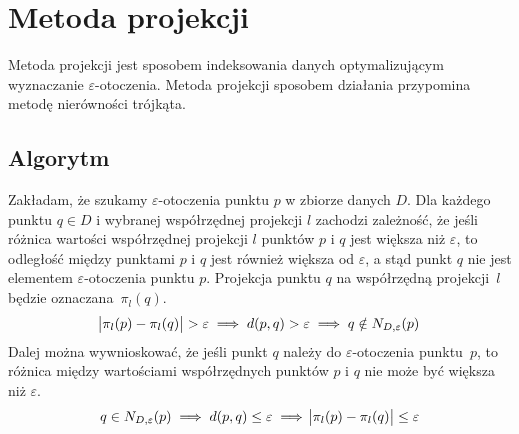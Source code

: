 \section{Metoda projekcji}
Metoda projekcji jest sposobem indeksowania danych optymalizującym wyznaczanie $ \varepsilon $-otoczenia. Metoda projekcji sposobem działania przypomina metodę nierówności trójkąta.
\subsection{Algorytm}
Zakładam, że szukamy $ \varepsilon $-otoczenia punktu $ p $ w zbiorze danych $ D $. Dla każdego punktu $ q \in D $ i wybranej współrzędnej projekcji $ l $ zachodzi zależność, że jeśli różnica wartości współrzędnej projekcji $ l $ punktów $ p $ i $ q $ jest większa niż $ \varepsilon $, to odległość między punktami $ p $ i $ q $ jest również większa od $ \varepsilon $, a stąd punkt $ q $ nie jest elementem $ \varepsilon $-otoczenia punktu $ p $. Projekcja punktu $ q $ na współrzędną \mbox{projekcji $ l $} będzie \mbox{oznaczana $ \pi_l(q) $}.
\begin{equation}
	\abs{\pi_l(p) - \pi_l(q)} > \varepsilon \implies d(p,q) > \varepsilon	\implies q \notin N_{D,\varepsilon}(p)
\end{equation}
Dalej można wywnioskować, że jeśli punkt $ q $ należy do $ \varepsilon $-otoczenia \mbox{punktu $ p $}, to różnica między wartościami współrzędnych punktów $ p $ i $ q $ nie może być większa niż $ \varepsilon $.
\begin{equation}\label{eq:projection}
	q \in N_{D,\varepsilon}(p) \implies d(p,q) \le \varepsilon \implies \abs{\pi_l(p) - \pi_l(q)} \le \varepsilon
\end{equation}
